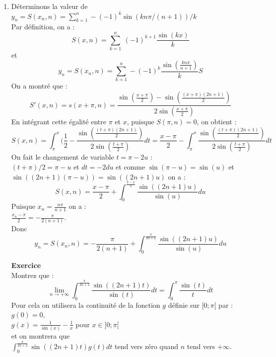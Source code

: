 \documentclass[a4paper,11pt]{book}
\begin{document}
\begin{enumerate}
\item D\'eterminons la valeur de $\displaystyle y_n=S(x_n,n)=\sum_{k=1}^n-(-1)^k\sin(kn\pi/(n+1))/k$\\
Par d\'efinition, on a :\\
$$S(x,n)=\sum_{k=1}^n \ (-1)^{k+1} \frac{\sin(kx)}{k}$$ 
et
$$y_n=S(x_n,n)=\sum_{k=1}^n-(-1)^k\frac{\sin(\frac{kn\pi}{n+1})}{k}S$$
On a montr\'e  que :
$$S'(x,n)=s(x+\pi,n)=\frac{\sin(\frac{x+\pi}{2})-\sin(\frac{(x+\pi)(2n+1)}{2})}{2\sin(\frac{x+\pi}{2})}$$
\noindent En int\'egrant  cette \'egalit\'e entre $\pi$ et $x$, puisque 
$S(\pi,n)=0$, on obtient :\\
$$S(x,n)=\int_\pi^x(\frac{1}{2}-\frac{\sin(\frac{(t+\pi)(2n+1)}{2})}{2\sin(\frac{t+\pi}{2})}dt=\frac{x-\pi}{2}-\int_\pi^x \frac{\sin(\frac{(t+\pi)(2n+1)}{2})}{2\sin(\frac{t+\pi}{2})}dt$$
On fait le changement de variable  $t=\pi-2u$ :\\
$(t+\pi)/2=\pi-u$ et $dt=-2du$ et comme $\sin(\pi-u)=\sin(u)$ et 
$\sin((2n+1)(\pi-u))=\sin((2n+1)u)$ on a :\\
$$S(x,n)=\frac{x-\pi}{2}+\int_0^{\frac{\pi-x}{2}}\frac{\sin((2n+1)u)}{\sin(u)}du$$
Puisque $\displaystyle x_n=\frac{n\pi}{n+1}$ on a :\\
$\displaystyle\frac{x_n-\pi}{2}=-\frac{\pi}{2(n+1)}$.\\
Donc
$$y_n=S(x_n,n)=-\frac{\pi}{2(n+1)}+\int_0^{\frac{\pi}{2n+2}}\frac{\sin((2n+1)u)}{\sin(u)}du$$

{\bf Exercice}\\
Montrez que :
$$\lim_{n\rightarrow +\infty}\int_0^{\frac{\pi}{2n+2}}\frac{\sin((2n+1)t)}{\sin(t)}dt=\int_0^\pi \frac{\sin(t)}{t}dt$$
 Pour cela on utilisera la continuit\'e de la fonction 
$g$ d\'efinie sur $[0;\pi[$ par :\\
$g(0)=0$,\\
$\displaystyle g(x)=\frac{1}{\sin(x)}-\frac{1}{x} $ pour $x\in]0;\pi[$ \\ 
et on montrera  que \\
$\displaystyle \int_0^{\frac{\pi}{2n+2}}\sin((2n+1)t)g(t)dt$ tend vers z\'ero 
quand $n$ tend vers $+\infty$.\\


\end{enumerate}
\end{document}

